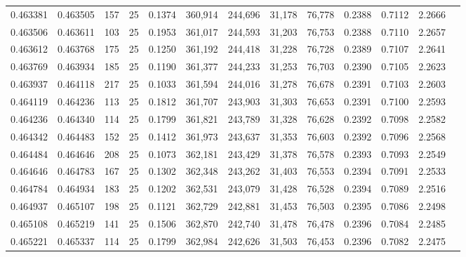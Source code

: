 \begin{tabular}{rrrrrrrrrrrrr}
0.463381 & 0.463505 &   157 &  25 &                                     0.1374 & 360,914 & 244,696 &  31,178 &  76,778 & 0.2388 & 0.7112 & 2.2666 \\
0.463506 & 0.463611 &   103 &  25 &                                     0.1953 & 361,017 & 244,593 &  31,203 &  76,753 & 0.2388 & 0.7110 & 2.2657 \\
0.463612 & 0.463768 &   175 &  25 &                                     0.1250 & 361,192 & 244,418 &  31,228 &  76,728 & 0.2389 & 0.7107 & 2.2641 \\
0.463769 & 0.463934 &   185 &  25 &                                     0.1190 & 361,377 & 244,233 &  31,253 &  76,703 & 0.2390 & 0.7105 & 2.2623 \\
0.463937 & 0.464118 &   217 &  25 &                                     0.1033 & 361,594 & 244,016 &  31,278 &  76,678 & 0.2391 & 0.7103 & 2.2603 \\
0.464119 & 0.464236 &   113 &  25 &                                     0.1812 & 361,707 & 243,903 &  31,303 &  76,653 & 0.2391 & 0.7100 & 2.2593 \\
0.464236 & 0.464340 &   114 &  25 &                                     0.1799 & 361,821 & 243,789 &  31,328 &  76,628 & 0.2392 & 0.7098 & 2.2582 \\
0.464342 & 0.464483 &   152 &  25 &                                     0.1412 & 361,973 & 243,637 &  31,353 &  76,603 & 0.2392 & 0.7096 & 2.2568 \\
0.464484 & 0.464646 &   208 &  25 &                                     0.1073 & 362,181 & 243,429 &  31,378 &  76,578 & 0.2393 & 0.7093 & 2.2549 \\
0.464646 & 0.464783 &   167 &  25 &                                     0.1302 & 362,348 & 243,262 &  31,403 &  76,553 & 0.2394 & 0.7091 & 2.2533 \\
0.464784 & 0.464934 &   183 &  25 &                                     0.1202 & 362,531 & 243,079 &  31,428 &  76,528 & 0.2394 & 0.7089 & 2.2516 \\
0.464937 & 0.465107 &   198 &  25 &                                     0.1121 & 362,729 & 242,881 &  31,453 &  76,503 & 0.2395 & 0.7086 & 2.2498 \\
0.465108 & 0.465219 &   141 &  25 &                                     0.1506 & 362,870 & 242,740 &  31,478 &  76,478 & 0.2396 & 0.7084 & 2.2485 \\
0.465221 & 0.465337 &   114 &  25 &                                     0.1799 & 362,984 & 242,626 &  31,503 &  76,453 & 0.2396 & 0.7082 & 2.2475 \\

\end{tabular}
